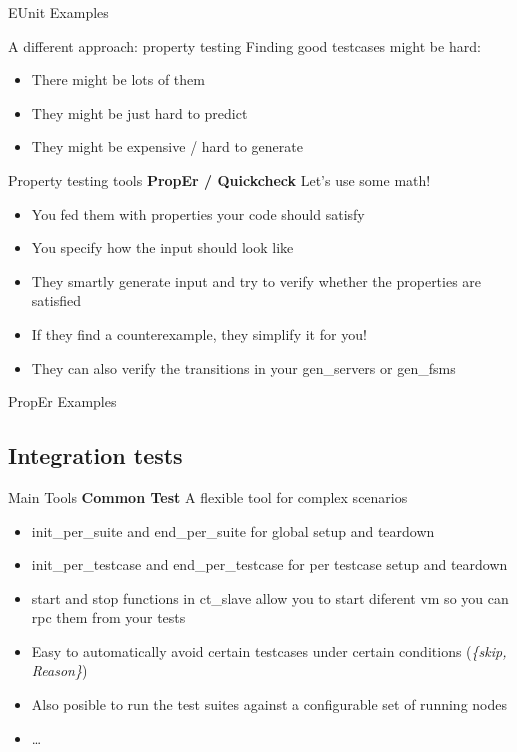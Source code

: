 \documentclass[pdf]{beamer}
\begin{document}
\begin{frame}{EUnit Examples}
\end{frame}

\begin{frame}{A different approach: property testing}
    Finding good testcases might be hard:
    \begin{itemize}
    \item There might be lots of them
    \pause
    \item They might be just hard to predict
    \pause
    \item They might be expensive / hard to generate
    \end{itemize}
\end{frame}

\begin{frame}{Property testing tools}
    \textbf{PropEr / Quickcheck} Let's use some math!
    \begin{itemize}
    \pause
    \item You fed them with properties your code should satisfy
    \pause
    \item You specify how the input should look like
    \pause
    \item They smartly generate input and try to verify whether the properties are satisfied
    \pause
    \item If they find a counterexample, they simplify it for you!
    \pause
    \item They can also verify the transitions in your gen\_servers or gen\_fsms
    \end{itemize}
\end{frame}

\begin{frame}{PropEr Examples}
\end{frame}

\subsection*{Integration tests}
\label{integration_tests}

\begin{frame}{Main Tools}
    \textbf{Common Test} A flexible tool for complex scenarios
    \begin{itemize}
    \pause
    \item init\_per\_suite and end\_per\_suite for global setup and teardown
    \pause
    \item init\_per\_testcase and end\_per\_testcase for per testcase setup and teardown
    \pause
    \item start and stop functions in ct\_slave allow you to start diferent vm so you can rpc them from your tests
    \pause
    \item Easy to automatically avoid certain testcases under certain conditions (\emph{\{skip, Reason\}})
    \pause
    \item Also posible to run the test suites against a configurable set of running nodes
    \pause
    \item \dots
    \end{itemize}
\end{frame}
\end{document}
